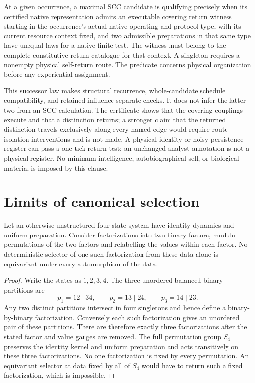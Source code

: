 \begin{definition}\label{def:core}
At a given occurrence, a maximal SCC candidate is qualifying precisely when its certified native representation admits an executable covering return witness starting in the occurrence's actual native operating and protocol type, with its current resource context fixed, and two admissible preparations in that same type have unequal laws for a native finite test. The witness must belong to the complete constitutive return catalogue for that context. A singleton requires a nonempty physical self-return route. The predicate concerns physical organization before any experiential assignment.
\end{definition}

This successor law makes structural recurrence, whole-candidate schedule
compatibility, and retained influence separate checks. It does not infer
the latter two from an SCC calculation. The certificate shows that the
covering couplings execute and that a distinction returns; a stronger
claim that the returned distinction travels exclusively along every
named edge would require route-isolation interventions and is not made.
A physical identity or noisy-persistence register can pass
a one-tick return test; an unchanged analyst annotation is not a physical
register. No minimum intelligence, autobiographical self, or biological
material is imposed by this clause.

\section{Limits of canonical selection}
\label{sec:spc2-canonicality}
\begin{theorem}
\label{thm:spc2-no-factor-selector}
Let an otherwise unstructured four-state system have identity dynamics
and uniform preparation. Consider factorizations into two binary factors,
modulo permutations of the two factors and relabelling the values within
each factor. No deterministic selector of one such factorization from
these data alone is equivariant under every automorphism of the data.
\end{theorem}
\begin{proof}
Write the states as $1,2,3,4$. The three unordered balanced binary
partitions are
\[
p_1=12\mid34,\qquad p_2=13\mid24,\qquad p_3=14\mid23.
\]
Any two distinct partitions intersect in four singletons and hence define
a binary-by-binary factorization. Conversely each such factorization
gives an unordered pair of these partitions. There are therefore exactly
three factorizations after the stated factor and value gauges are removed.
The full permutation group $S_4$ preserves the identity kernel and uniform
preparation and acts transitively on these three factorizations. No one
factorization is fixed by every permutation. An equivariant selector at
data fixed by all of $S_4$ would have to return such a fixed factorization,
which is impossible.
\end{proof}

